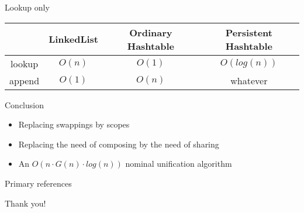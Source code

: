 \documentclass[pdf]{beamer}
\begin{document}
\begin{frame}{Lookup only}

  {\centering
    \begin{tabular}{|c|c|c|c|}
      \hline
      & LinkedList & Ordinary Hashtable & Persistent Hashtable \\
      \hline
      lookup & $O(n)$ & $O(1)$ & $O(log(n))$\\
      \hline
      append & $O(1)$ & $O(n)$ & whatever\\
      \hline
    \end{tabular}
  \par}
\end{frame}

\begin{frame}{Conclusion}
  
  {\centering
    \begin{itemize}
  \item Replacing swappings by scopes
  \item Replacing the need of composing by the need of sharing
  \item An $O(n \cdot G(n) \cdot log(n))$ nominal unification algorithm
    \end{itemize}
    \par}
\end{frame}
 
\begin{frame}{Primary references}


\end{frame}

\begin{frame}
  \begin{center}
    \Huge Thank you!
   \end{center}
\end{frame}
  
\end{document}

